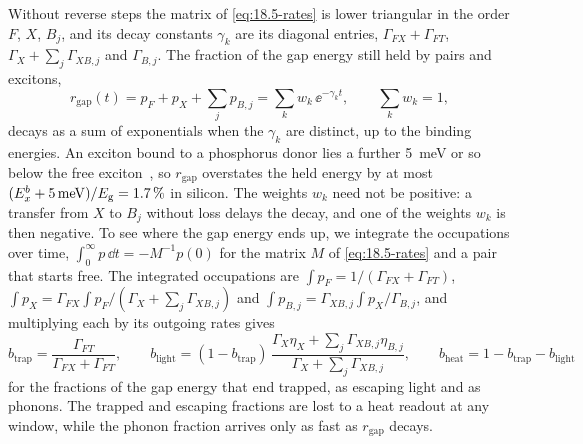 Without reverse steps the matrix of \cref{eq:18.5-rates} is lower triangular in the order $F$, $X$, $B_j$, and its decay constants $\gamma_k$ are its diagonal entries, $\varGamma_{FX} + \varGamma_{FT}$, $\varGamma_X + \sum_j\varGamma_{XB,j}$ and $\varGamma_{B,j}$. The fraction of the gap energy still held by pairs and excitons,
\begin{equation}
  r_{\mathrm{gap}}(t) = p_F + p_X + \sum_jp_{B,j} = \sum_kw_k\,\ee^{-\gamma_kt} , \qquad \sum_kw_k = 1 ,
  \label{eq:18.5-rgap}
\end{equation}
decays as a sum of exponentials when the $\gamma_k$ are distinct, up to the binding energies. An exciton bound to a phosphorus donor lies a further \SI{5}{meV} or so below the free exciton~\cite{lo2015hybrid}, so $r_{\mathrm{gap}}$ overstates the held energy by at most $(E_x^b + \SI{5}{meV})/E_{\mathrm{g}} = \SI{1.7}{\percent}$ in silicon. The weights $w_k$ need not be positive: a transfer from $X$ to $B_j$ without loss delays the decay, and one of the weights $w_k$ is then negative. To see where the gap energy ends up, we integrate the occupations over time, $\int_0^\infty p\,\dd t = -M^{-1}p(0)$ for the matrix $M$ of \cref{eq:18.5-rates} and a pair that starts free. The integrated occupations are $\int p_F = 1/(\varGamma_{FX} + \varGamma_{FT})$, $\int p_X = \varGamma_{FX}\int p_F/(\varGamma_X + \sum_j\varGamma_{XB,j})$ and $\int p_{B,j} = \varGamma_{XB,j}\int p_X/\varGamma_{B,j}$, and multiplying each by its outgoing rates gives
\begin{equation}
  b_{\mathrm{trap}} = \frac{\varGamma_{FT}}{\varGamma_{FX} + \varGamma_{FT}} , \qquad
  b_{\mathrm{light}} = (1 - b_{\mathrm{trap}})\,\frac{\varGamma_X\eta_X + \sum_j\varGamma_{XB,j}\eta_{B,j}}{\varGamma_X + \sum_j\varGamma_{XB,j}} , \qquad
  b_{\mathrm{heat}} = 1 - b_{\mathrm{trap}} - b_{\mathrm{light}}
  \label{eq:18.5-split}
\end{equation}
for the fractions of the gap energy that end trapped, as escaping light and as phonons. The trapped and escaping fractions are lost to a heat readout at any window, while the phonon fraction arrives only as fast as $r_{\mathrm{gap}}$ decays.

